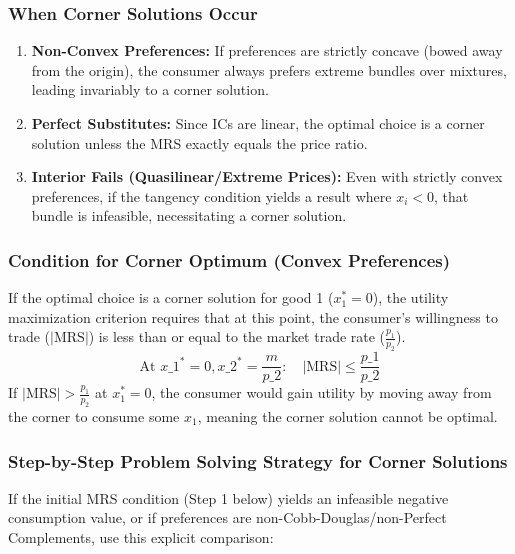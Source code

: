 \documentclass{article}
\begin{document}
\subsubsection*{When Corner Solutions Occur}

\begin{enumerate}
    \item \textbf{Non-Convex Preferences:} If preferences are strictly concave (bowed away from the origin), the consumer always prefers extreme bundles over mixtures, leading invariably to a corner solution.
    \item \textbf{Perfect Substitutes:} Since ICs are linear, the optimal choice is a corner solution unless the MRS exactly equals the price ratio.
    \item \textbf{Interior Fails (Quasilinear/Extreme Prices):} Even with strictly convex preferences, if the tangency condition yields a result where $x_i < 0$, that bundle is infeasible, necessitating a corner solution.
\end{enumerate}

\subsubsection*{Condition for Corner Optimum (Convex Preferences)}

If the optimal choice is a corner solution for good 1 ($x_1^*=0$), the utility maximization criterion requires that at this point, the consumer's willingness to trade ($|\text{MRS}|$) is less than or equal to the market trade rate ($\frac{p_1}{p_2}$).
\[ \text{At } x\_1^* =0, x\_2^*=\frac{m}{p\_2}: \quad |\text{MRS}| \leq \frac{p\_1}{p\_2} \]
If $|\text{MRS}| > \frac{p_1}{p_2}$ at $x_1^*=0$, the consumer would gain utility by moving away from the corner to consume some $x_1$, meaning the corner solution cannot be optimal.

\subsubsection*{Step-by-Step Problem Solving Strategy for Corner Solutions}

If the initial MRS condition (Step 1 below) yields an infeasible negative consumption value, or if preferences are non-Cobb-Douglas/non-Perfect Complements, use this explicit comparison:
\end{document}
